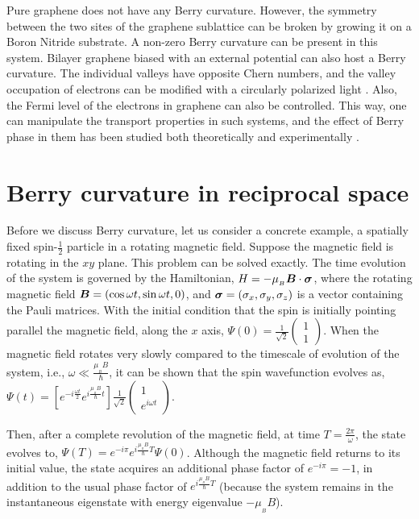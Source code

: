 \documentclass{report}
\renewcommand\vec[1]{\ensuremath\boldsymbol{#1}} %
\begin{document}
Pure graphene does not have any Berry curvature. However, the symmetry between the two sites of the graphene sublattice can be broken by growing it on a Boron Nitride substrate. A non-zero Berry curvature can be present in this system. Bilayer graphene biased with an external potential can also host a Berry curvature. The individual valleys have opposite Chern numbers, and the valley occupation of electrons can be modified with a circularly polarized light \cite{valleyPolBilayerGraphene}. Also, the Fermi level of the electrons in graphene can also be controlled. This way, one can manipulate the transport properties in such systems, and the effect of Berry phase in them has been studied both theoretically \cite{PhysRevB.79.245424, PhysRevLett.99.236809, Ostrovsky_2008} and experimentally \cite{Serlin900}.

\chapter{Berry curvature in reciprocal space}
Before we discuss Berry curvature, let us consider a concrete example, a spatially fixed spin-$\frac{1}{2}$ particle in a rotating magnetic field. Suppose the magnetic field is rotating in the $xy$ plane. This problem can be solved exactly. The time evolution of the system is governed by the Hamiltonian, $H = -\mu_{_B} \vec{B}\cdot\vec{\sigma}$, where the rotating magnetic field $\vec{B} = (\cos{\omega t}, \sin{\omega t},0)$, and $\vec{\sigma} = (\sigma_x, \sigma_y, \sigma_z)$ is a vector containing the Pauli matrices. With the initial condition that the spin is initially pointing parallel the magnetic field, along the $x$ axis, $\Psi(0) = \frac{1}{\sqrt{2}}\begin{pmatrix}
	1 \\
	1 
\end{pmatrix}$. When the magnetic field rotates very slowly compared to the timescale of evolution of the system, i.e., $\omega \ll \frac{\mu_{_B} B}{\hbar}$, it can be shown that the spin wavefunction evolves as, $\Psi(t) = \left[e^{-i\frac{\omega t}{2}} e^{i \frac{\mu_{_B} B}{\hbar}t}\right] \frac{1}{\sqrt{2}}\begin{pmatrix}
1 \\
e^{i\omega t} 
\end{pmatrix}$.

Then, after a complete revolution of the magnetic field, at time $T = \frac{2\pi}{\omega}$, the state evolves to,
$\Psi(T) = e^{-i \pi} e^{i \frac{\mu_{_B} B}{\hbar} T} \Psi(0)$.
Although the magnetic field returns to its initial value, the state acquires an additional phase factor of $e^{-i \pi} = -1$, in addition to the usual phase factor of $e^{i \frac{\mu_{_B} B}{\hbar} T}$ (because the system remains in the instantaneous eigenstate with energy eigenvalue $- \mu_{_B} B$).
\end{document}
